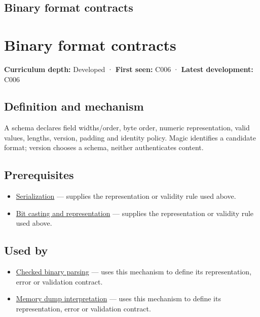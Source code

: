 \hypertarget{appendix-590bbb2424c1}{}
\section*{Binary format contracts}
\chapter{Binary format contracts}\label{appendix-590bbb2424c1-binary-format-contracts}

\textbf{Curriculum depth:} Developed · \textbf{First seen:} C006 · \textbf{Latest development:} C006

\section{Definition and mechanism}\label{appendix-590bbb2424c1-definition-and-mechanism}

A schema declares field widths/order, byte order, numeric representation, valid values, lengths, version, padding and identity policy. Magic identifies a candidate format; version chooses a schema, neither authenticates content.

\section{Prerequisites}\label{appendix-590bbb2424c1-prerequisites}

\begin{itemize}
\tightlist
\item
  \hyperref[appendix-91d09ebed979]{Serialization} --- supplies the representation or validity rule used above.
\item
  \hyperref[appendix-34ee45f161c1]{Bit casting and representation} --- supplies the representation or validity rule used above.
\end{itemize}

\section{Used by}\label{appendix-590bbb2424c1-used-by}

\begin{itemize}
\tightlist
\item
  \hyperref[appendix-652d81568de9]{Checked binary parsing} --- uses this mechanism to define its representation, error or validation contract.
\item
  \hyperref[appendix-230b59c0676b]{Memory dump interpretation} --- uses this mechanism to define its representation, error or validation contract.
\end{itemize}

